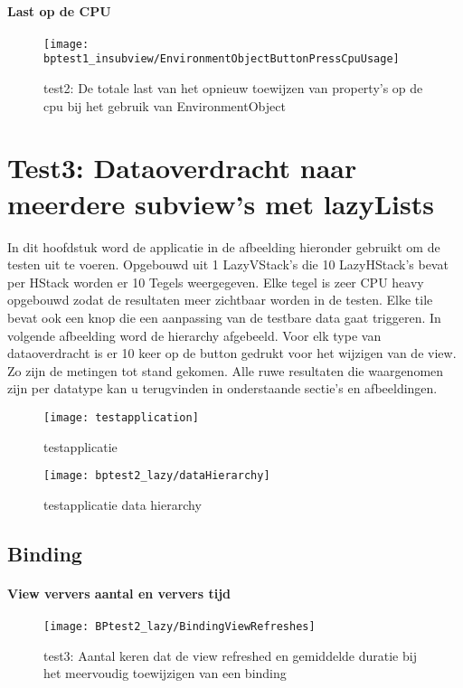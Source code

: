 \paragraph{Last op de CPU}
\begin{figure}[H]
    \centering
    \texttt{[image: bptest1\_insubview/EnvironmentObjectButtonPressCpuUsage]} 
    \caption{test2: De totale last van het opnieuw toewijzen van property's op de cpu bij het gebruik van EnvironmentObject}
    \label{fig:cpuWeightEnvironmentObject1}
\end{figure}

\section{Test3: Dataoverdracht naar meerdere subview's met lazyLists}
In dit hoofdstuk word de applicatie in de afbeelding hieronder gebruikt om de testen uit te voeren. Opgebouwd uit 1 LazyVStack's die 10 LazyHStack's bevat per HStack worden er 10 Tegels weergegeven. Elke tegel is zeer CPU heavy opgebouwd zodat de resultaten meer zichtbaar worden in de testen. Elke tile bevat ook een knop die een aanpassing van de testbare data gaat triggeren. In volgende afbeelding word de hierarchy afgebeeld. Voor elk type van dataoverdracht is er 10 keer op de button gedrukt voor het wijzigen van de view. Zo zijn de metingen tot stand gekomen. Alle ruwe resultaten die waargenomen zijn per datatype kan u terugvinden in onderstaande sectie's en afbeeldingen.
\begin{figure}[htbp]
    \centering
    \texttt{[image: testapplication]} 
    \caption{testapplicatie}
    \label{fig:testapplication2}
\end{figure}
\begin{figure}[htbp]
    \centering
    \texttt{[image: bptest2\_lazy/dataHierarchy]} 
    \caption{testapplicatie data hierarchy}
    \label{fig:testapplicationHierarchy2}
\end{figure}
\subsection{Binding}
\paragraph{View ververs aantal en ververs tijd}
\begin{figure}[H]
    \centering
    \texttt{[image: BPtest2\_lazy/BindingViewRefreshes]} 
    \caption{test3: Aantal keren dat de view refreshed en gemiddelde duratie bij het meervoudig toewijzigen van een binding}
    \label{fig:viewRefreshesBinding2}
\end{figure}
